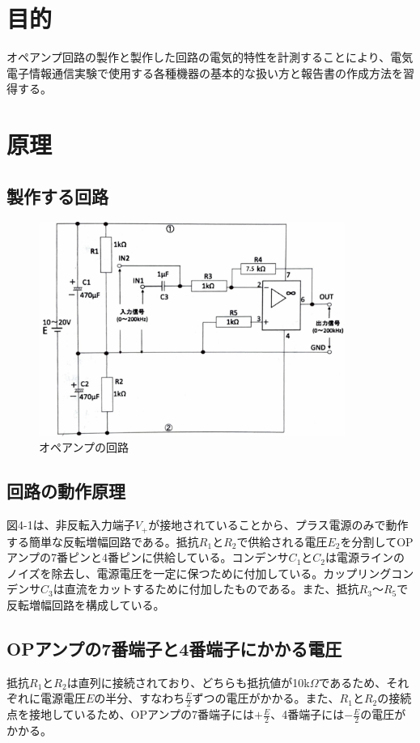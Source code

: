 \documentclass{jlreq}
\numberwithin{equation}{section}
\begin{document}
\section{目的}
オペアンプ回路の製作と製作した回路の電気的特性を計測することにより、電気電子情報通信実験で使用する各種機器の基本的な扱い方と報告書の作成方法を習得する。

\section{原理}
\subsection{製作する回路}

\begin{figure}[h]
  \centering
  \includegraphics[width=100mm]{kairozu.png}
  \caption{オペアンプの回路}
\end{figure}

\subsection{回路の動作原理}
図4-1は、非反転入力端子\(V_+\)が接地されていることから、プラス電源のみで動作する簡単な反転増幅回路である。抵抗\(R_1\)と\(R_2\)で供給される電圧\(E_2\)を分割してOPアンプの7番ピンと4番ピンに供給している。コンデンサ\(C_1\)と\(C_2\)は電源ラインのノイズを除去し、電源電圧を一定に保つために付加している。カップリングコンデンサ\(C_3\)は直流をカットするために付加したものである。また、抵抗\(R_3\)〜\(R_5\)で反転増幅回路を構成している。

\subsection{OPアンプの7番端子と4番端子にかかる電圧}
抵抗\(R_1\)と\(R_2\)は直列に接続されており、どちらも抵抗値が10k\(\Omega\)であるため、それぞれに電源電圧\(E\)の半分、すなわち\(\frac{E}{2}\)ずつの電圧がかかる。また、\(R_1\)と\(R_2\)の接続点を接地しているため、OPアンプの7番端子には\(+\frac{E}{2}\)、4番端子には\(-\frac{E}{2}\)の電圧がかかる。
\end{document}
